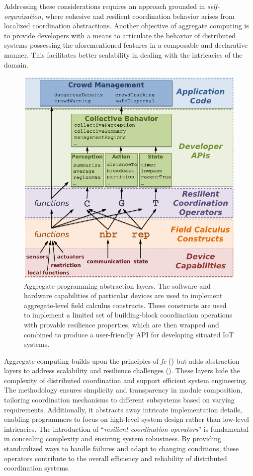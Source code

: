Addressing these considerations requires an approach grounded in \textit{self-organization}, where cohesive and resilient coordination behavior arises from localized coordination abstractions. Another objective of aggregate computing is to provide developers with a means to articulate the behavior of distributed systems possessing the aforementioned features in a composable and declarative manner. This facilitates better scalability in dealing with the intricacies of the domain.

\begin{figure}
    \centering
    \includegraphics[width=.8\linewidth]{figures/aggregate-programming-abstraction-layers.png}
    \caption{Aggregate programming abstraction layers. The software and hardware capabilities of particular devices are used to implement aggregate-level field
    calculus constructs. These constructs are used to implement a limited set of building-block coordination operations with provable resilience properties,
    which are then wrapped and combined to produce a user-friendly API for developing situated \ac{IoT} systems.}
    \label{fig:aggregate-abstraction-layers}
\end{figure}

Aggregate computing builds upon the principles of \textit{\ac{fc}} () but adds abstraction layers to address scalability and resilience challenges (). These layers hide the complexity of distributed coordination and support efficient system engineering. The methodology ensures simplicity and transparency in module composition, tailoring coordination mechanisms to different subsystems based on varying requirements. Additionally, it abstracts away intricate implementation details, enabling programmers to focus on high-level system design rather than low-level intricacies. The introduction of ``\textit{resilient coordination operators}'' is fundamental in concealing complexity and ensuring system robustness. By providing standardized ways to handle failures and adapt to changing conditions, these operators contribute to the overall efficiency and reliability of distributed coordination systems.

